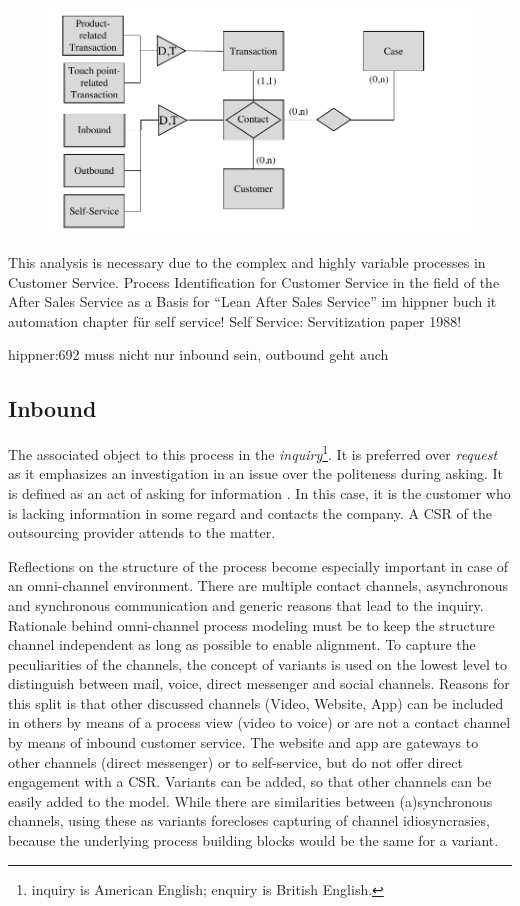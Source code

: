 	\begin{figure}[caption={Framework}, label={fig:contacterm}]
		{	\includegraphics[width=.8\textwidth]{figures/contacterm.pdf}}
	\end{figure} 

	
	This analysis is necessary due to the complex and highly variable processes in Customer Service. Process Identification for Customer Service in the field of the After Sales Service as a Basis for “Lean After Sales Service”
	im hippner buch it automation chapter für self service!
	Self Service: Servitization paper 1988!
	
	hippner:692 muss nicht nur inbound sein, outbound geht auch
	
	\subsection{Inbound}
	The associated object to this process in the \textit{inquiry}\footnote{inquiry is American English; enquiry is British English.}. It is preferred over \textit{request} as it emphasizes an investigation in an issue over the politeness during asking. It is defined as an act of asking for information \citep{oxfordenquiry, oxfordrequest}. In this case, it is the customer who is lacking information in some regard and contacts the company. A \acrshort{CSR} of the outsourcing provider attends to the matter. 
	
	Reflections on the structure of the process become especially important in case of an omni-channel environment. There are multiple contact channels, asynchronous and synchronous communication and generic reasons that lead to the inquiry. Rationale behind omni-channel process modeling must be to keep the structure channel independent as long as possible to enable alignment. To capture the peculiarities of the channels, the concept of variants is used on the lowest level to distinguish between mail, voice, direct messenger and social channels. Reasons for this split is that other discussed channels (Video, Website, App) can be included in others by means of a process view (video to voice) or are not a contact channel by means of inbound customer service. The website and app are gateways to other channels (direct messenger) or to self-service, but do not offer direct engagement with a \acrshort{CSR}. Variants can be added, so that other channels can be easily added to the model. While there are similarities between (a)synchronous channels, using these as variants forecloses capturing of channel idiosyncrasies, because the underlying process building blocks would be the same for a variant. 
	
